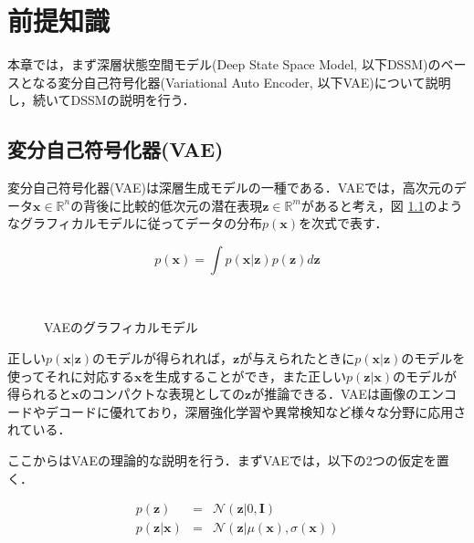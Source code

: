 \chapter{前提知識}
\label{chap:prerequisite}
本章では，まず深層状態空間モデル(Deep State Space Model, 以下DSSM)のベースとなる変分自己符号化器(Variational Auto Encoder, 以下VAE)について説明し，続いてDSSMの説明を行う．

\section{変分自己符号化器(VAE)}
\label{section:vae}
変分自己符号化器(VAE)\cite{kingma2013autoencoding}は深層生成モデルの一種である．VAEでは，高次元のデータ$\bm{x} \in \mathbb{R}^n$の背後に比較的低次元の潜在表現$\bm{z} \in \mathbb{R}^m$があると考え，図 \ref{fig:vae}のようなグラフィカルモデルに従ってデータの分布$p(\bm{x})$を次式で表す．

\begin{equation}
  p(\bm{x}) = \int p(\bm{x}|\bm{z}) p(\bm{z}) d\bm{z} \label{eq:vae}
\end{equation}

\begin{figure}[tbp]
  \begin{center}
    \caption{VAEのグラフィカルモデル}
    \label{fig:vae}
　\end{center}
\end{figure}

正しい$p(\bm{x}|\bm{z})$のモデルが得られれば，$\bm{z}$が与えられたときに$p(\bm{x}|\bm{z})$のモデルを使ってそれに対応する$\bm{x}$を生成することができ，また正しい$p(\bm{z}|\bm{x})$のモデルが得られると$\bm{x}$のコンパクトな表現としての$\bm{z}$が推論できる．VAEは画像のエンコードやデコードに優れており，深層強化学習や異常検知など様々な分野に応用されている．\cite{ha1803world}\cite{chalapathy2019deep}

\vspace{\baselineskip}
ここからはVAEの理論的な説明を行う．まずVAEでは，以下の2つの仮定を置く．

\begin{eqnarray}
  p(\bm{z}) &=& \mathcal{N}(\bm{z}|0,\bm{I}) \label{eq:z}\\
  p(\bm{z}|\bm{x}) &=& \mathcal{N}(\bm{z}|\mu(\bm{x}),\sigma(\bm{x}))	\label{eq:z_cond}
\end{eqnarray}

